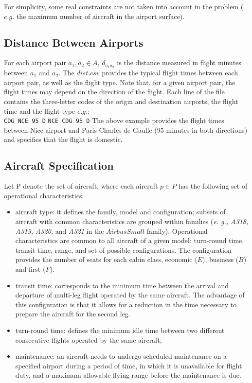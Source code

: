 \documentclass[ijoo,nonblindrev]{informs-ijoo}
\begin{document}
For simplicity, some real constraints are not taken into account in the problem ($e. g.$ the maximum number of aircraft in the airport surface).

\subsection{Distance Between Airports} \label{subsec:distance}

For each airport pair $a_1, a_2  \in  A $, $d_{a_1 a_2}$ is the distance measured in flight minutes between $a_1$ and $a_2$.
The $dist.csv$ provides the typical flight times between each airport pair, as well as the flight type. Note that, for a given airport pair, the flight times may depend on the direction of the flight. Each line of the file contains the three-letter codes of the origin and destination airports, the flight time and the flight type $e.g.$: \\
\newline
{\texttt{\footnotesize CDG NCE 95 D}}
\newline
{\texttt{\footnotesize NCE CDG 95 D}}
\newline
\newline
The above example provides the flight times between Nice airport and Paris-Charles de Gaulle (95 minutes in both directions) and specifies that the flight is domestic.

\subsection{Aircraft Specification } \label{subsec:aicraft}

Let P denote the set of aircraft, where each aircraft $p \in  P$ has the following set of operational characteristics:\\
\begin{itemize}
	\item aircraft type: it defines the family, model and configuration; subsets of aircraft with common characteristics are grouped within families (\textit{e. g., A318, A319, A320,} and \textit{A321} in the \textit{$Airbus Small$} family). Operational characteristics are common to all aircraft of a given model: turn-round time, transit time, range, and set of possible configurations. The configuration provides the number of seats for each cabin class, economic ($E$), business ($B$) and first ($F$).
	
	\item transit time: corresponds to the minimum time between the arrival and departure of multi-leg flight operated by the same aircraft. The advantage of this configuration is that it allows for a reduction in the time necessary to prepare the aircraft for the second leg.
	
	\item turn-round time: defines the minimum idle time between two different consecutive flights operated by the same aircraft;
	\item maintenance: an aircraft needs to undergo scheduled maintenance on a specified airport during a period of time, in which it is unavailable for flight duty, and a maximum allowable flying range before the maintenance is due. 
\end{itemize}
\end{document}

